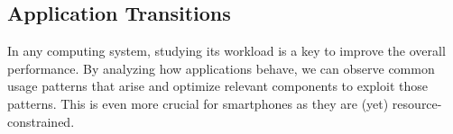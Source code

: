 \subsection{Application Transitions}
\label{subsec-apptransitions}

In any computing system, studying its workload is a key to improve the overall
performance. By analyzing how applications behave, we can observe common usage
patterns that arise and optimize relevant components to exploit those patterns.
This is even more crucial for smartphones as they are (yet)
resource-constrained. 
